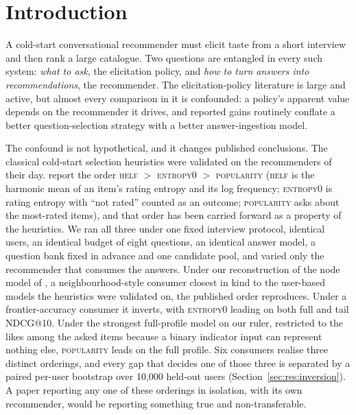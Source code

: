 \documentclass[manuscript,screen]{acmart}
\begin{document}

\maketitle

\section{Introduction}\label{sec:intro}

A cold-start conversational recommender must elicit taste from a short interview and then rank a large catalogue. Two questions are entangled in every such system: \emph{what to ask}, the elicitation policy, and \emph{how to turn answers into recommendations}, the recommender. The elicitation-policy literature is large and active, but almost every comparison in it is confounded: a policy's apparent value depends on the recommender it drives, and reported gains routinely conflate a better question-selection strategy with a better answer-ingestion model.

The confound is not hypothetical, and it changes published conclusions. The classical cold-start selection heuristics were validated on the recommenders of their day. \citet{rashid2008learning} report the order \textsc{helf} $>$ \textsc{entropy0} $>$ \textsc{popularity} (\textsc{helf} is the harmonic mean of an item's rating entropy and its log frequency; \textsc{entropy0} is rating entropy with ``not rated'' counted as an outcome; \textsc{popularity} asks about the most-rated items), and that order has been carried forward as a property of the heuristics. We ran all three under one fixed interview protocol, identical users, an identical budget of eight questions, an identical answer model, a question bank fixed in advance and one candidate pool, and varied only the recommender that consumes the answers. Under our reconstruction of the node model of \citet{golbandi2011adaptive}, a neighbourhood-style consumer closest in kind to the user-based models the heuristics were validated on, the published order reproduces. Under a frontier-accuracy consumer it inverts, with \textsc{entropy0} leading on both full and tail NDCG@10. Under the strongest full-profile model on our ruler, restricted to the likes among the asked items because a binary indicator input can represent nothing else, \textsc{popularity} leads on the full profile. Six consumers realise three distinct orderings, and every gap that decides one of those three is separated by a paired per-user bootstrap over 10,000 held-out users (Section~\ref{sec:res:inversion}). A paper reporting any one of these orderings in isolation, with its own recommender, would be reporting something true and non-transferable.
\end{document}
